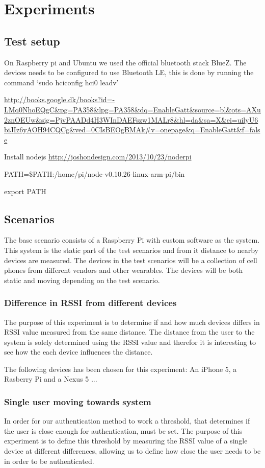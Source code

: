 \section{Experiments}

\subsection{Test setup}

On Raspberry pi and Ubuntu we used the official bluetooth stack BlueZ.
The devices needs to be configured to use Bluetooth LE, this is done by running the command ‘sudo hciconfig hci0 leadv’

\url{http://books.google.dk/books?id=-LMq0NhoEQgC&pg=PA358&lpg=PA358&dq=EnableGatt&source=bl&ots=AXu2znOEUw&sig=PjvPAADd4H3WInDAEFszw1MALr8&hl=da&sa=X&ei=uilyU6biJIz6yAOH94CQCg&ved=0CIsBEOgBMAk#v=onepage&q=EnableGatt&f=false}

Install nodejs
\url{http://joshondesign.com/2013/10/23/noderpi}

PATH=\$PATH:/home/pi/node-v0.10.26-linux-arm-pi/bin

export PATH

\subsection{Scenarios}

The base scenario consists of a Raspberry Pi with custom software as the system.
This system is the static part of the test scenarios and from it distance to nearby devices are measured.
The devices in the test scenarios will be a collection of cell phones from different vendors and other wearables.
The devices will be both static and moving depending on the test scenario.


\subsubsection{Difference in RSSI from different devices}
The purpose of this experiment is to determine if and how much devices differs in RSSI value measured from the same distance. The distance from the user to the system is solely determined using the RSSI value and therefor it is interesting to see how the each device influences the distance.
	
The following devices has been chosen for this experiment: An iPhone 5, a Rasberry Pi and a Nexus 5 ... 

\subsubsection{Single user moving towards system}
\label{section:MovingTowardsSystem}
In order for our authentication method to work a threshold, that determines if the user is close enough for authentication, must be set. The purpose of this experiment is to define this threshold by measuring the RSSI value of a single device at different differences, allowing us to define how close the user needs to be in order to be authenticated. 

